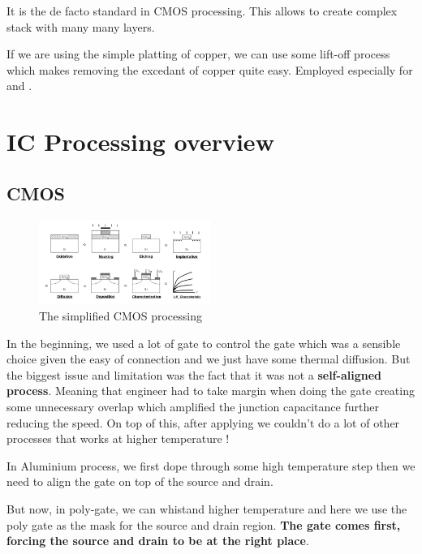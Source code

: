 \documentclass[
]{article}
\begin{document}
It is the de facto standard in CMOS processing. This allows to create
complex stack with many many layers.

If we are using the simple platting of copper, we can use some lift-off
process which makes removing the excedant of copper quite easy. Employed
especially for and .

\hypertarget{ic-processing-overview}{%
\section{IC Processing overview}\label{ic-processing-overview}}

\hypertarget{cmos}{%
\subsection{CMOS}\label{cmos}}

\begin{figure}
\hypertarget{fig:enter-label}{%
\centering
\includegraphics[width=0.5\textwidth,height=\textheight]{simplified_CMOS.png}
\caption{The simplified CMOS processing}\label{fig:enter-label}
}
\end{figure}

In the beginning, we used a lot of gate to control the gate which was a
sensible choice given the easy of connection and we just have some
thermal diffusion. But the biggest issue and limitation was the fact
that it was not a \textbf{self-aligned process}. Meaning that engineer
had to take margin when doing the gate creating some unnecessary overlap
which amplified the junction capacitance further reducing the speed. On
top of this, after applying we couldn't do a lot of other processes that
works at higher temperature !

In Aluminium process, we first dope through some high temperature step
then we need to align the gate on top of the source and drain.

But now, in poly-gate, we can whistand higher temperature and here we
use the poly gate as the mask for the source and drain region.
\textbf{The gate comes first, forcing the source and drain to be at the
right place}.
\end{document}
